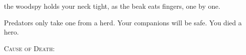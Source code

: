 the \gls{woodspy} holds your neck tight, as the beak eats fingers, one by one.

Predators only take one from a herd.
Your companions will be safe.
You died a hero.

{\scshape Cause of Death: \textbf{}}
